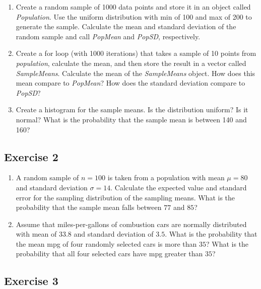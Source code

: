 \documentclass[
  letterpaper,
  DIV=11,
  numbers=noendperiod]{scrreprt}
\providecommand{\tightlist}{%
  \setlength{\itemsep}{0pt}\setlength{\parskip}{0pt}}\usepackage{longtable,booktabs,array}
\begin{document}
\begin{enumerate}
\def\labelenumi{\arabic{enumi}.}
\tightlist
\item
  Create a random sample of 1000 data points and store it in an object
  called \emph{Population}. Use the uniform distribution with min of 100
  and max of 200 to generate the sample. Calculate the mean and standard
  deviation of the random sample and call \emph{PopMean} and
  \emph{PopSD}, respectively.
\item
  Create a for loop (with 1000 iterations) that takes a sample of 10
  points from \emph{population}, calculate the mean, and then store the
  result in a vector called \emph{SampleMeans}. Calculate the mean of
  the \emph{SampleMeans} object. How does this mean compare to
  \emph{PopMean}? How does the standard deviation compare to
  \emph{PopSD}?
\item
  Create a histogram for the sample means. Is the distribution uniform?
  Is it normal? What is the probability that the sample mean is between
  140 and 160?
\end{enumerate}

\hypertarget{exercise-2-20}{%
\subsection*{Exercise 2}\label{exercise-2-20}}

\begin{enumerate}
\def\labelenumi{\arabic{enumi}.}
\item
  A random sample of \(n=100\) is taken from a population with mean
  \(\mu=80\) and standard deviation \(\sigma=14\). Calculate the
  expected value and standard error for the sampling distribution of the
  sampling means. What is the probability that the sample mean falls
  between \(77\) and \(85\)?
\item
  Assume that miles-per-gallons of combustion cars are normally
  distributed with mean of \(33.8\) and standard deviation of \(3.5\).
  What is the probability that the mean mpg of four randomly selected
  cars is more than \(35\)? What is the probability that all four
  selected cars have mpg greater than \(35\)?
\end{enumerate}

\hypertarget{exercise-3-20}{%
\subsection*{Exercise 3}\label{exercise-3-20}}
\end{document}
